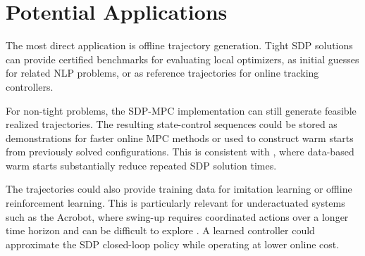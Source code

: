 \section{Potential Applications}
\label{sec:potential_applications}

The most direct application is offline trajectory generation. Tight SDP solutions
can provide certified benchmarks for evaluating local optimizers, as initial guesses 
for related NLP problems, 
or as reference trajectories for online tracking controllers.

For non-tight problems, the SDP-MPC implementation can still generate feasible
realized trajectories. The resulting state-control sequences could
be stored as demonstrations for faster online MPC methods or used to construct
warm starts from previously solved configurations. This is consistent with
\cite{Kang_2026Fast}, where data-based warm starts substantially reduce repeated
SDP solution times.

The trajectories could also provide training data for imitation learning or
offline reinforcement learning. This is particularly relevant for underactuated
systems such as the Acrobot, where swing-up requires coordinated actions over a
longer time horizon and can be difficult to explore \cite{acrobot_RL}.
A learned controller could approximate the SDP closed-loop policy while operating
at lower online cost.

